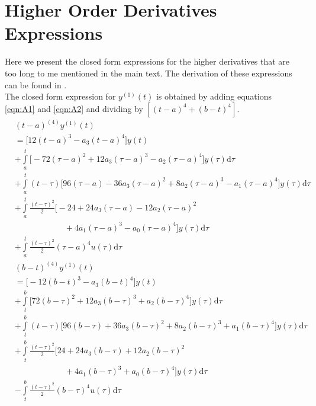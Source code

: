 \documentclass[letterpaper%
, twoside%
, 12pt%
,memoire%
, english%
,creativecommons,hyperref%
]{thETS}
\begin{document}
\section{Higher Order Derivatives Expressions} \label{Sec:App1}
Here we present the closed form expressions for the higher derivatives that are too long to me mentioned in the main text. The derivation of these expressions can be found in \citep{RN120}.\\
The closed form expression for $y^{(1)}(t)$ is obtained by adding equations \eqref{eqn:A1} and \eqref{eqn:A2} and dividing by $[(t-a)^{4}+(b-t)^{4}]$.
\begin{equation}\label{eqn:A1}
\begin{split}
	&(t-a)^{(4)}y^{(1)}(t)\\
	&=\bigg[ 12(t-a)^{3}-a_3(t-a)^{4}\bigg]y(t)\\
	&+\int\limits_{a}^{t}\bigg[-72(\tau-a)^{2}+12a_3(\tau-a)^{3}-a_2(\tau-a)^4\bigg]y(\tau)\mathrm{d}\tau\\
	&+\int\limits_{a}^{t}(t-\tau)\bigg[96(\tau-a)-36a_3(\tau-a)^{2}+8a_2(\tau-a)^{3}-a_1(\tau-a)^{4}\bigg]y(\tau)\mathrm{d}\tau\\
	&+\int\limits_{a}^{t}\frac{(t-\tau)^{2}}{2}\bigg[-24+24a_3(\tau-a)-12a_2(\tau-a)^{2}
	\\&\qquad\qquad\qquad{}+4a_1(\tau-a)^{3}-a_0(\tau-a)^{4}\bigg]y(\tau)\mathrm{d}\tau\\
	&+\int\limits_{a}^{t}\frac{(t-\tau)^{2}}{2}(\tau-a)^{4}u(\tau)\mathrm{d}\tau	
\end{split}
\end{equation}
\begin{equation}\label{eqn:A2}
\begin{split}
	&(b-t)^{(4)}y^{(1)}(t)\\
	&=\bigg[-12(b-t)^{3}-a_3(b-t)^{4} \bigg]y(t)\\
	&+\int\limits_{t}^{b}\bigg[72(b-\tau)^{2}+12a_3(b-\tau)^{3}+a_2(b-\tau)^4\bigg]y(\tau)\mathrm{d}\tau\\
	&+\int\limits_{t}^{b}(t-\tau)\bigg[96(b-\tau)+36a_3(b-\tau)^{2}+8a_2(b-\tau)^{3}+a_1(b-\tau)^{4}\bigg]y(\tau)\mathrm{d}\tau\\
	&+\int\limits_{t}^{b}\frac{(t-\tau)^{2}}{2}\bigg[24+24a_3(b-\tau)+12a_2(b-\tau)^{2}
	\\&\qquad\qquad\qquad{}+4a_1(b-\tau)^{3}+a_0(b-\tau)^{4}\bigg]y(\tau)\mathrm{d}\tau\\
	&-\int\limits_{t}^{b}\frac{(t-\tau)^{2}}{2}(b-\tau)^{4}u(\tau)\mathrm{d}\tau	
\end{split}
\end{equation}
\end{document}
